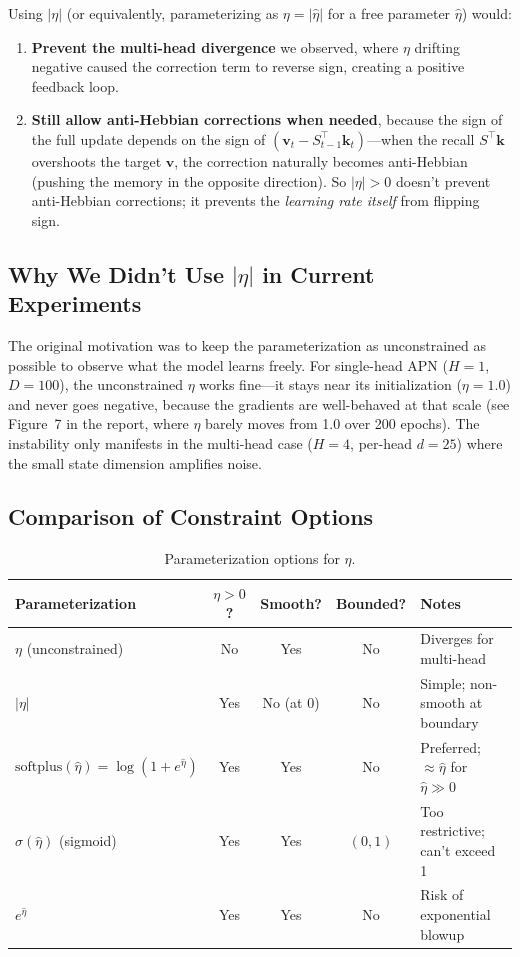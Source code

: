 \documentclass[11pt,a4paper]{article}
\begin{document}
Using $|\eta|$ (or equivalently, parameterizing as $\eta = |\hat{\eta}|$ for a free parameter $\hat{\eta}$) would:
\begin{enumerate}
\item \textbf{Prevent the multi-head divergence} we observed, where $\eta$ drifting negative caused the correction term to reverse sign, creating a positive feedback loop.
\item \textbf{Still allow anti-Hebbian corrections when needed}, because the sign of the full update depends on the sign of $(\mathbf{v}_t - S_{t-1}^\top \mathbf{k}_t)$---when the recall $S^\top \mathbf{k}$ overshoots the target $\mathbf{v}$, the correction naturally becomes anti-Hebbian (pushing the memory in the opposite direction). So $|\eta| > 0$ doesn't prevent anti-Hebbian corrections; it prevents the \emph{learning rate itself} from flipping sign.
\end{enumerate}

\subsection{Why We Didn't Use $|\eta|$ in Current Experiments}

The original motivation was to keep the parameterization as unconstrained as possible to observe what the model learns freely.
For single-head APN ($H=1$, $D=100$), the unconstrained $\eta$ works fine---it stays near its initialization ($\eta = 1.0$) and never goes negative, because the gradients are well-behaved at that scale (see Figure~7 in the report, where $\eta$ barely moves from 1.0 over 200 epochs).
The instability only manifests in the multi-head case ($H=4$, per-head $d=25$) where the small state dimension amplifies noise.

\subsection{Comparison of Constraint Options}

\begin{table}[h]
\centering
\caption{Parameterization options for $\eta$.}
\begin{tabular}{lcccl}
\toprule
\textbf{Parameterization} & $\eta > 0$? & \textbf{Smooth?} & \textbf{Bounded?} & \textbf{Notes} \\
\midrule
$\eta$ (unconstrained) & No & Yes & No & Diverges for multi-head \\
$|\eta|$ & Yes & No (at 0) & No & Simple; non-smooth at boundary \\
$\text{softplus}(\hat{\eta}) = \log(1+e^{\hat{\eta}})$ & Yes & Yes & No & Preferred; $\approx \hat{\eta}$ for $\hat{\eta} \gg 0$ \\
$\sigma(\hat{\eta})$ (sigmoid) & Yes & Yes & $(0,1)$ & Too restrictive; can't exceed 1 \\
$e^{\hat{\eta}}$ & Yes & Yes & No & Risk of exponential blowup \\
\bottomrule
\end{tabular}
\end{table}
\end{document}
